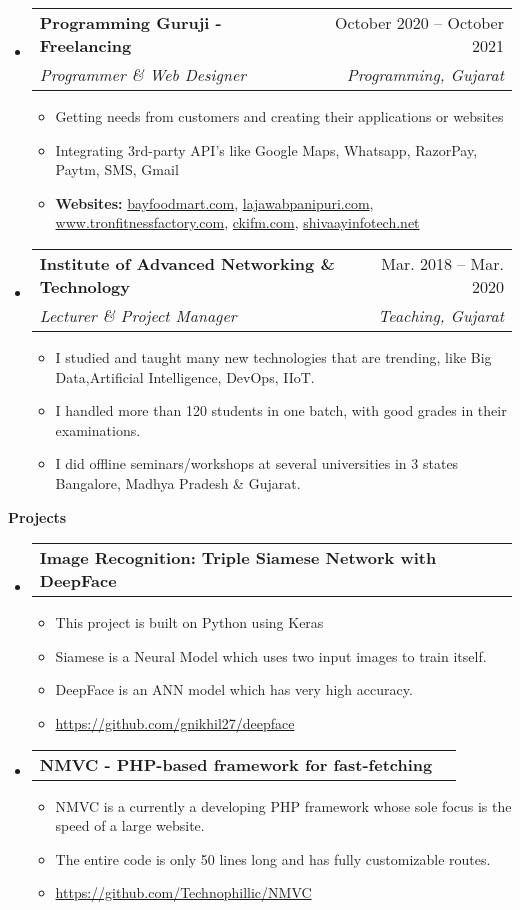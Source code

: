 \documentclass[letterpaper,12pt]{article}[leftmargin=*]
\makeatletter
\def \entryspacing {-0pt}
\renewcommand{\section}[2]{\vspace{5pt}
  \colorbox{secondary}{\color{white}\raggedbottom\normalsize\textbf{{#1}{\hspace{7pt}#2}}}
}
\newcommand{\resumeEntryStart}{\begin{itemize}[leftmargin=2.5mm]}
\newcommand{\resumeEntryEnd}{\end{itemize}\vspace{\entryspacing}}
\newcommand{\resumeItemListStart}{\begin{itemize}[leftmargin=4.5mm]}
\newcommand{\resumeItemListEnd}{\end{itemize}}
\newcommand{\resumeItem}[1]{
  \item\small{
    {#1 \vspace{-2pt}}
  }
}
\newcommand{\resumeEntryTSDL}[4]{
  \vspace{-1pt}\item[]
    \begin{tabularx}{0.97\textwidth}{X@{\hspace{60pt}}r}
      \textbf{\color{primary}#1} & {\firabook\color{accent}\small#2} \\
      \textit{\color{accent}\small#3} & \textit{\color{accent}\small#4} \\
    \end{tabularx}\vspace{-6pt}
}
\newcommand{\resumeEntryTD}[2]{
  \vspace{-1pt}\item[]
    \begin{tabularx}{0.97\textwidth}{X@{\hspace{60pt}}r}
      \textbf{\color{primary}#1} & {\firabook\color{accent}\small#2} \\
    \end{tabularx}\vspace{-6pt}
}
\makeatother
\begin{document}
  \resumeEntryStart
    \resumeEntryTSDL
      {Programming Guruji - Freelancing}{October 2020 -- October 2021}
      {Programmer \& Web Designer}{Programming, Gujarat}
    \resumeItemListStart
      \resumeItem {Getting needs from customers and creating their applications or websites}
      \resumeItem {Integrating 3rd-party API's like Google Maps, Whatsapp, RazorPay, Paytm, SMS, Gmail}
      \resumeItem {{\bf Websites:} \url{bayfoodmart.com}, \space \url{lajawabpanipuri.com}, \space \url{www.tronfitnessfactory.com}, \linebreak 
      \url{ckifm.com}, \space \url{shivaayinfotech.net}}
    \resumeItemListEnd
  \resumeEntryEnd

  \resumeEntryStart
    \resumeEntryTSDL
      {Institute of Advanced Networking \& Technology}{Mar. 2018 -- Mar. 2020}
      {Lecturer \& Project Manager}{Teaching, Gujarat}
    \resumeItemListStart
      \resumeItem { I studied and taught many new technologies that are trending, like Big Data,\linebreak Artificial Intelligence, DevOps, IIoT.}
      \resumeItem{I handled more than 120 students in one batch, with good grades in their examinations.}
      \resumeItem{I did offline seminars/workshops at several universities in 3 states Bangalore, Madhya Pradesh \& Gujarat.}
    \resumeItemListEnd
  \resumeEntryEnd


\section{\faFlask}{Projects}


\resumeEntryStart
\resumeEntryTD
  {Image Recognition: Triple Siamese Network with DeepFace}{}
\resumeItemListStart
\resumeItem {This project is built on Python using Keras}
  \resumeItem {Siamese is a Neural Model which uses two input images to train itself.}
  \resumeItem {DeepFace is an ANN model which has very high accuracy.}
  \resumeItem {\url{https://github.com/gnikhil27/deepface}}
\resumeItemListEnd
\resumeEntryEnd


\resumeEntryStart
    \resumeEntryTD
      {NMVC - PHP-based framework for fast-fetching}{}
    \resumeItemListStart
      \resumeItem {NMVC is a currently a developing PHP framework whose sole focus is the speed of a large website.}
      \resumeItem {The entire code is only 50 lines long and has fully customizable routes.}
      \resumeItem {\url{https://github.com/Technophillic/NMVC}}
    \resumeItemListEnd
  \resumeEntryEnd
\end{document}
